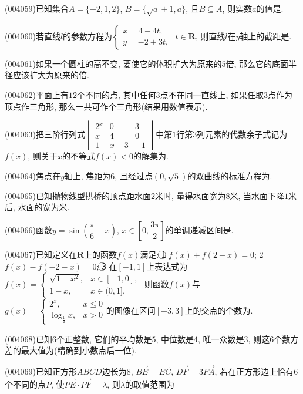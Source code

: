 \item (004059)已知集合$A=\{-2,1,2\}$, $B=\{\sqrt a+1,a\}$, 且$B\subseteq A$, 则实数$a$的值是.
\item (004060)若直线$l$的参数方程为$\begin{cases} x=4-4t, \\ y=-2+3t, \end{cases}$ $t\in \mathbf{R}$, 则直线$l$在$y$轴上的截距是.
\item (004061)如果一个圆柱的高不变, 要使它的体积扩大为原来的$5$倍, 那么它的底面半径应该扩大为原来的倍.
\item (004062)平面上有$12$个不同的点, 其中任何$3$点不在同一直线上, 如果任取$3$点作为顶点作三角形, 那么一共可作个三角形(结果用数值表示).
\item (004063)把三阶行列式$\begin{vmatrix} 2^x & 0 & 3  \\x & 4 & 0  \\1 & x-3 & -1  \end{vmatrix}$中第$1$行第$3$列元素的代数余子式记为$f(x)$, 则关于$x$的不等式$f(x)<0$的解集为.
\item (004064)焦点在$y$轴上, 焦距为$6$, 且经过点$(0,\sqrt 5)$的双曲线的标准方程为.
\item (004065)已知抛物线型拱桥的顶点距水面$2$米时, 量得水面宽为$8$米, 当水面下降$1$米后, 水面的宽为米.
\item (004066)函数$y=\sin (\dfrac{\pi}6-x)$, $x\in [0,\dfrac{3\pi }2]$的单调递减区间是.
\item (004067)已知定义在$\mathbf{R}$上的函数$f(x)$满足: \textcircled{1} $f(x)+f(2-x)=0$; \textcircled{2} $f(x)-f(-2-x)=0$; \textcircled{3} 在$[-1,1]$上表达式为$f(x)=\begin{cases} \sqrt{1-x^2}, & x\in [-1,0], \\ 1-x, & x\in (0,1], \end{cases}$ 则函数$f(x)$与$g(x)=\begin{cases} {2^x}, & x\le 0 \\ \log_\frac 12x, & x>0 \end{cases}$的图像在区间$[-3,3]$上的交点的个数为.
\item (004068)已知$6$个正整数, 它们的平均数是$5$, 中位数是$4$, 唯一众数是$3$, 则这$6$个数方差的最大值为(精确到小数点后一位).
\item (004069)已知正方形$ABCD$边长为$8$, $\overrightarrow{BE}=\overrightarrow{EC}$, $\overrightarrow{DF}=3\overrightarrow{FA}$, 若在正方形边上恰有$6$个不同的点$P$, 使$\overrightarrow{PE}\cdot \overrightarrow{PF}=\lambda$, 则$\lambda$的取值范围为
